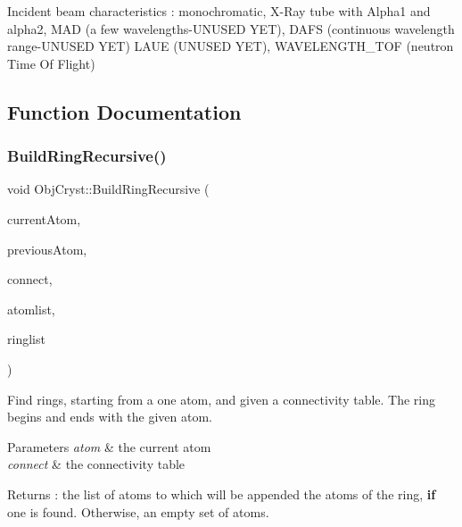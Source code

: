Incident beam characteristics \+: monochromatic, X-\/\+Ray tube with Alpha1 and alpha2, M\+AD (a few wavelengths-\/\+U\+N\+U\+S\+ED Y\+ET), D\+A\+FS (continuous wavelength range-\/\+U\+N\+U\+S\+ED Y\+ET) L\+A\+UE (U\+N\+U\+S\+ED Y\+ET), W\+A\+V\+E\+L\+E\+N\+G\+T\+H\+\_\+\+T\+OF (neutron Time Of Flight) 

\subsection{Function Documentation}
\mbox{\label{namespace_obj_cryst_acb0b160e8f24597d041fd18e19bd8214}} 
\subsubsection{\texorpdfstring{BuildRingRecursive()}{BuildRingRecursive()}}
{\footnotesize\ttfamily void Obj\+Cryst\+::\+Build\+Ring\+Recursive (\begin{DoxyParamCaption}\item[{\mbox{\hyperlink{class_obj_cryst_1_1_mol_atom}{Mol\+Atom}} $\ast$}]{current\+Atom,  }\item[{\mbox{\hyperlink{class_obj_cryst_1_1_mol_atom}{Mol\+Atom}} $\ast$}]{previous\+Atom,  }\item[{const map$<$ \mbox{\hyperlink{class_obj_cryst_1_1_mol_atom}{Mol\+Atom}} $\ast$, set$<$ \mbox{\hyperlink{class_obj_cryst_1_1_mol_atom}{Mol\+Atom}} $\ast$ $>$ $>$ \&}]{connect,  }\item[{list$<$ \mbox{\hyperlink{class_obj_cryst_1_1_mol_atom}{Mol\+Atom}} $\ast$ $>$ \&}]{atomlist,  }\item[{map$<$ set$<$ \mbox{\hyperlink{class_obj_cryst_1_1_mol_atom}{Mol\+Atom}} $\ast$ $>$, list$<$ \mbox{\hyperlink{class_obj_cryst_1_1_mol_atom}{Mol\+Atom}} $\ast$ $>$ $>$ \&}]{ringlist }\end{DoxyParamCaption})}

Find rings, starting from a one atom, and given a connectivity table. The ring begins and ends with the given atom.


\begin{DoxyParams}{Parameters}
{\em atom} & the current atom \\
\hline
{\em connect} & the connectivity table \\
\hline
\end{DoxyParams}
\begin{DoxyReturn}{Returns}
\+: the list of atoms to which will be appended the atoms of the ring, {\bfseries{if}} one is found. Otherwise, an empty set of atoms. 
\end{DoxyReturn}

